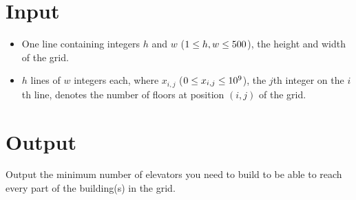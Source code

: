 \section*{Input}
	\begin{itemize}
		\item One line containing integers $h$ and $w$ ($1\leq h, w\leq 500$), the height and width of the grid.
		\item $h$ lines of $w$ integers each, where $x_{i,j}$ ($0\leq x_{i,j} \leq 10^9$),
			the $j$th integer on the $i$th line, denotes the number of floors at position $(i,j)$ of the grid.
	\end{itemize}

\section*{Output}
    Output the minimum number of elevators you need to build to be able to reach every part of the building(s) in the grid.

